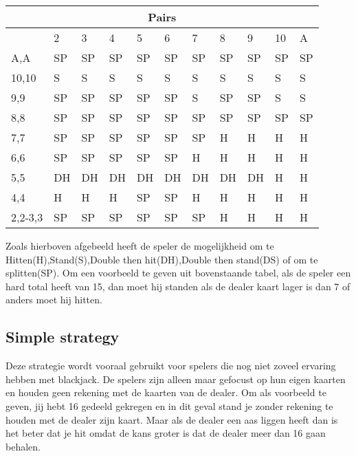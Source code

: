 \documentclass[conference]{IEEEtran}
\begin{document}
\begin{table}[ht]
\begin{tabular}{|l|l|l|l|l|l|l|l|l|l|l|}
\multicolumn{11}{|c|}{Pairs}                                                   \\ \hline
                             & 2  & 3  & 4  & 5  & 6  & 7  & 8  & 9  & 10 & A  \\ \hline
A,A                          & SP & SP & SP & SP & SP & SP & SP & SP & SP & SP \\ \hline
10,10                        & S  & S  & S  & S  & S  & S  & S  & S  & S  & S  \\ \hline
9,9                          & SP & SP & SP & SP & SP & S  & SP & SP & S  & S  \\ \hline
8,8                          & SP & SP & SP & SP & SP & SP & SP & SP & SP & SP \\ \hline
7,7                          & SP & SP & SP & SP & SP & SP & H  & H  & H  & H  \\ \hline
6,6                          & SP & SP & SP & SP & SP & H  & H  & H  & H  & H  \\ \hline
5,5                          & DH & DH & DH & DH & DH & DH & DH & DH & H  & H  \\ \hline
4,4                          & H  & H  & H  & SP & SP & H  & H  & H  & H  & H  \\ \hline
2,2-3,3                      & SP & SP & SP & SP & SP & SP & H  & H  & H  & H  \\ \hline
\end{tabular}

\end{table}

Zoals hierboven afgebeeld heeft de speler de mogelijkheid om te Hitten(H),Stand(S),Double then hit(DH),Double then stand(DS) of om te splitten(SP). Om een voorbeeld te geven uit bovenstaande tabel, als de speler een hard total heeft van 15, dan moet hij standen als de dealer kaart lager is dan 7 of anders moet hij hitten.





\subsection{Simple strategy}

Deze strategie wordt vooraal gebruikt voor spelers die nog niet zoveel ervaring hebben met blackjack. De spelers zijn alleen maar gefocust op hun eigen kaarten en houden geen rekening met de kaarten van de dealer. Om als voorbeeld te geven, jij hebt 16 gedeeld gekregen en in dit geval stand je zonder rekening te houden met de dealer zijn kaart. Maar als de dealer een aas liggen heeft dan is het beter dat je hit omdat de kans groter is dat de dealer meer dan 16 gaan behalen.
\end{document}
